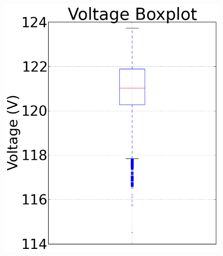 \documentclass[10pt]{sensys-proc}
\begin{document}
\begin{figure}[t!]
{                                                     \includegraphics[scale=0.135]{./figures/us_voltage_box.png}}
              \vspace{-4mm}
               \hspace{-2mm}
             \newline      
                  

\end{figure}
\end{document}
